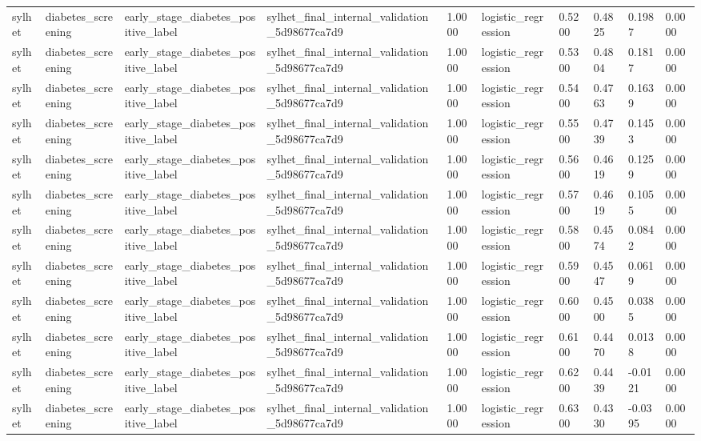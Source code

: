 \begin{tabular}{llllllllll}
sylhet & diabetes\_screening & early\_stage\_diabetes\_positive\_label & sylhet\_final\_internal\_validation\_5d98677ca7d9 & 1.0000 & logistic\_regression & 0.5200 & 0.4825 & 0.1987 & 0.0000 \\
sylhet & diabetes\_screening & early\_stage\_diabetes\_positive\_label & sylhet\_final\_internal\_validation\_5d98677ca7d9 & 1.0000 & logistic\_regression & 0.5300 & 0.4804 & 0.1817 & 0.0000 \\
sylhet & diabetes\_screening & early\_stage\_diabetes\_positive\_label & sylhet\_final\_internal\_validation\_5d98677ca7d9 & 1.0000 & logistic\_regression & 0.5400 & 0.4763 & 0.1639 & 0.0000 \\
sylhet & diabetes\_screening & early\_stage\_diabetes\_positive\_label & sylhet\_final\_internal\_validation\_5d98677ca7d9 & 1.0000 & logistic\_regression & 0.5500 & 0.4739 & 0.1453 & 0.0000 \\
sylhet & diabetes\_screening & early\_stage\_diabetes\_positive\_label & sylhet\_final\_internal\_validation\_5d98677ca7d9 & 1.0000 & logistic\_regression & 0.5600 & 0.4619 & 0.1259 & 0.0000 \\
sylhet & diabetes\_screening & early\_stage\_diabetes\_positive\_label & sylhet\_final\_internal\_validation\_5d98677ca7d9 & 1.0000 & logistic\_regression & 0.5700 & 0.4619 & 0.1055 & 0.0000 \\
sylhet & diabetes\_screening & early\_stage\_diabetes\_positive\_label & sylhet\_final\_internal\_validation\_5d98677ca7d9 & 1.0000 & logistic\_regression & 0.5800 & 0.4574 & 0.0842 & 0.0000 \\
sylhet & diabetes\_screening & early\_stage\_diabetes\_positive\_label & sylhet\_final\_internal\_validation\_5d98677ca7d9 & 1.0000 & logistic\_regression & 0.5900 & 0.4547 & 0.0619 & 0.0000 \\
sylhet & diabetes\_screening & early\_stage\_diabetes\_positive\_label & sylhet\_final\_internal\_validation\_5d98677ca7d9 & 1.0000 & logistic\_regression & 0.6000 & 0.4500 & 0.0385 & 0.0000 \\
sylhet & diabetes\_screening & early\_stage\_diabetes\_positive\_label & sylhet\_final\_internal\_validation\_5d98677ca7d9 & 1.0000 & logistic\_regression & 0.6100 & 0.4470 & 0.0138 & 0.0000 \\
sylhet & diabetes\_screening & early\_stage\_diabetes\_positive\_label & sylhet\_final\_internal\_validation\_5d98677ca7d9 & 1.0000 & logistic\_regression & 0.6200 & 0.4439 & -0.0121 & 0.0000 \\
sylhet & diabetes\_screening & early\_stage\_diabetes\_positive\_label & sylhet\_final\_internal\_validation\_5d98677ca7d9 & 1.0000 & logistic\_regression & 0.6300 & 0.4330 & -0.0395 & 0.0000 \\

\end{tabular}
